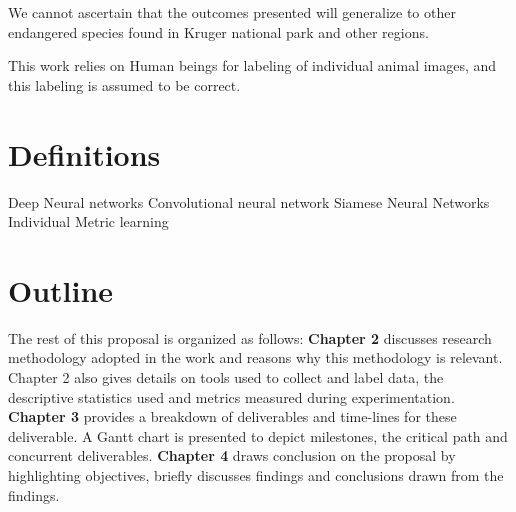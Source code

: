 We cannot ascertain that the outcomes presented will generalize to other endangered species found in Kruger national park and other regions.

This work relies on Human beings for labeling of individual animal images, and this labeling is assumed to be correct.

\section{Definitions}
Deep Neural networks \newline
Convolutional neural network
Siamese Neural Networks \newline
Individual \newline
Metric learning \newline

\section{Outline}
The rest of this proposal is organized as follows: \textbf{Chapter 2} discusses research methodology adopted in the work and reasons why this methodology is relevant. Chapter 2 also gives details on tools used to collect and label data, the descriptive statistics used and metrics measured during experimentation. \textbf{Chapter 3} provides a breakdown of deliverables and time-lines for these deliverable. A Gantt chart is presented to depict milestones, the critical path and concurrent deliverables. \textbf{Chapter 4} draws conclusion on the proposal by highlighting objectives, briefly discusses findings and conclusions drawn from the findings.  
